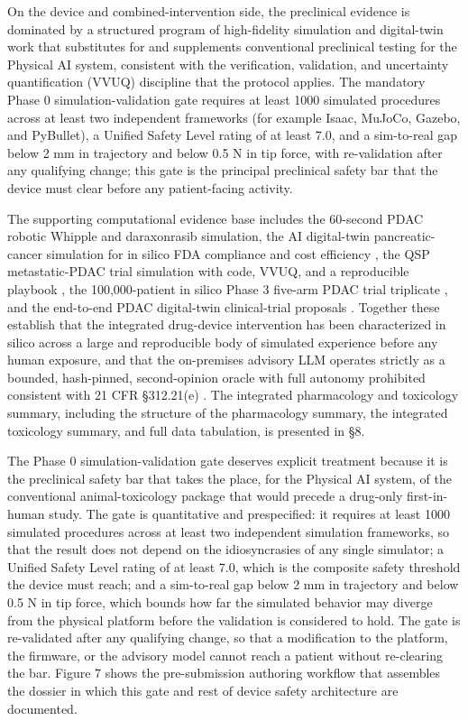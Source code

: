 On the device and combined-intervention side, the preclinical evidence is dominated
by a structured program of high-fidelity simulation and digital-twin work that
substitutes for and supplements conventional preclinical testing for the Physical AI
system, consistent with the verification, validation, and uncertainty
quantification (VVUQ) discipline that the protocol applies. The mandatory Phase 0
simulation-validation gate requires at least 1000 simulated procedures across at
least two independent frameworks (for example Isaac, MuJoCo, Gazebo, and PyBullet),
a Unified Safety Level rating of at least 7.0, and a sim-to-real gap below 2 mm in
trajectory and below 0.5 N in tip force, with re-validation after any qualifying
change; this gate is the principal preclinical safety bar that the device must clear
before any patient-facing activity.

The supporting computational evidence base
includes the 60-second PDAC robotic Whipple and daraxonrasib simulation, the AI
digital-twin pancreatic-cancer simulation for in silico FDA compliance and cost
efficiency \cite{fdadigtwinpc}, the QSP metastatic-PDAC trial simulation with code,
VVUQ, and a reproducible playbook \cite{qspmetpancre}, the 100,000-patient in silico
Phase 3 five-arm PDAC trial triplicate \cite{chatgpt100kp}, and the end-to-end PDAC
digital-twin clinical-trial proposals \cite{pdacdigtwinp}. Together these establish
that the integrated drug-device intervention has been characterized in silico across
a large and reproducible body of simulated experience before any human exposure, and
that the on-premises advisory LLM operates strictly as a bounded, hash-pinned,
second-opinion oracle with full autonomy prohibited consistent with 21 CFR
\S 312.21(e) \cite{clintrustpai, congress9510}. The integrated pharmacology and
toxicology summary, including the structure of the pharmacology summary, the
integrated toxicology summary, and full data tabulation, is presented in \S 8.

The Phase 0 simulation-validation gate deserves explicit treatment because it is the
preclinical safety bar that takes the place, for the Physical AI system, of the
conventional animal-toxicology package that would precede a drug-only first-in-human
study. The gate is quantitative and prespecified: it requires at least 1000 simulated
procedures across at least two independent simulation frameworks, so that the result
does not depend on the idiosyncrasies of any single simulator; a Unified Safety Level
rating of at least 7.0, which is the composite safety threshold the device must reach;
and a sim-to-real gap below 2 mm in trajectory and below 0.5 N in tip force, which
bounds how far the simulated behavior may diverge from the physical platform before
the validation is considered to hold. The gate is re-validated after any qualifying
change, so that a modification to the platform, the firmware, or the advisory model
cannot reach a patient without re-clearing the bar. Figure 7 shows the pre-submission
authoring workflow that assembles the dossier in which this gate and rest of
device safety architecture are documented.

